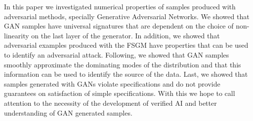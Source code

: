 In this paper we investigated numerical properties of samples produced 
with adversarial methods, specially Generative Adversarial Networks. We showed
that GAN samples have universal signatures that are dependent on the choice of
non-linearity on the last layer of the generator. In addition, we showed that
adversarial examples produced with the FSGM have properties that can be used to
identify an adversarial attack. Following, we showed that GAN samples smoothly
approximate the dominating modes of the distribution and that this information
can be used to identify the source of the data. Last, we showed that samples
generated with GANs violate specifications and do not provide guarantees on 
satisfaction of simple specifications. With this we hope to call attention to 
the necessity of the development of verified AI and better understanding of GAN
generated samples.
